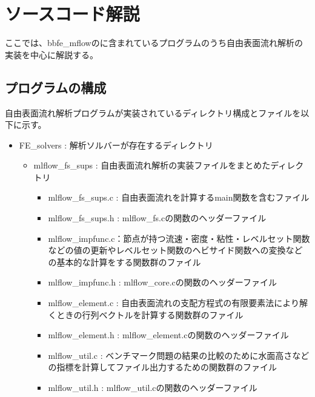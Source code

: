 \newpage
\section{ソースコード解説}
ここでは、bbfe\_mflowのに含まれているプログラムのうち自由表面流れ解析の実装を中心に解説する。

\subsection{プログラムの構成}
自由表面流れ解析プログラムが実装されているディレクトリ構成とファイルを以下に示す。

\begin{itemize}
	\item FE\_solvers : 解析ソルバーが存在するディレクトリ
  \begin{itemize}
    \item mlflow\_fs\_sups : 自由表面流れ解析の実装ファイルをまとめたディレクトリ
    \begin{itemize}
    	\item mlflow\_fs\_sups.c : 自由表面流れを計算するmain関数を含むファイル
    	\item mlflow\_fs\_sups.h : mlflow\_fs.cの関数のヘッダーファイル
    	\item mlflow\_impfunc.c：節点が持つ流速・密度・粘性・レベルセット関数などの値の更新やレベルセット関数のヘビサイド関数への変換などの基本的な計算をする関数群のファイル
    	\item mlflow\_impfunc.h : mlflow\_core.cの関数のヘッダーファイル
    	\item mlflow\_element.c : 自由表面流れの支配方程式の有限要素法により解くときの行列ベクトルを計算する関数群のファイル
    	\item mlflow\_element.h : mlflow\_element.cの関数のヘッダーファイル
    	\item mlflow\_util.c : ベンチマーク問題の結果の比較のために水面高さなどの指標を計算してファイル出力するための関数群のファイル
    	\item mlflow\_util.h : mlflow\_util.cの関数のヘッダーファイル
    \end{itemize}
  \end{itemize}
\end{itemize}


